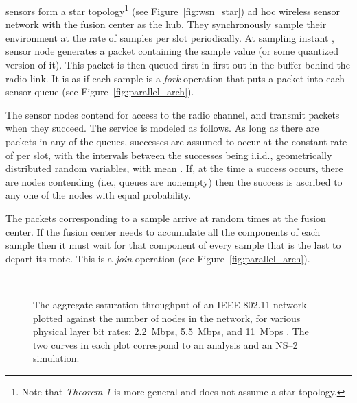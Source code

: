 \documentclass[acmtosn]{acmtrans2m}
\begin{document}
 sensors form a star topology\footnote{Note that {\em Theorem 1} 
is more general and does not assume a star topology.} (see 
Figure~\ref{fig:wsn_star}) ad hoc wireless sensor network with the
fusion center as the hub. They synchronously sample their environment
at the rate of  samples per slot periodically. At sampling instant
, sensor node  generates a packet containing the sample value
 (or some quantized version of it). This packet is then
queued first-in-first-out in the buffer behind the radio link. It is
as if each sample is a \emph{fork} operation that puts a packet into
each sensor queue (see Figure~\ref{fig:parallel_arch}).


The sensor nodes contend for access to the radio channel, and transmit
packets when they succeed. The service is modeled as follows. As long
as there are packets in any of the queues, successes are assumed to
occur at the constant rate of  per slot, with the intervals
between the successes being i.i.d., geometrically distributed random
variables, with mean . If, at the time a success occurs, there
are  nodes contending (i.e.,  queues are nonempty) then the
success is ascribed to any one of the  nodes with equal
probability. 

The  packets corresponding to a sample arrive at random times at
the fusion center. If the fusion center needs to accumulate all the
 components of each sample then it must wait for that component of
every sample that is the last to depart its mote. This is a \emph{join}
operation (see Figure~\ref{fig:parallel_arch}).









\begin{figure}[t]
  \centering
\ 
\caption{The aggregate saturation throughput  of an IEEE
  802.11 network plotted against the number of nodes in the network,
  for various physical layer bit rates: 2.2~Mbps, 5.5~Mbps, and
  11~Mbps .  The two curves in each plot correspond to an analysis and
  an NS--2 simulation.}
   \label{fig:sat_thpt_wlan_vs_n}
 \end{figure}
\end{document}
